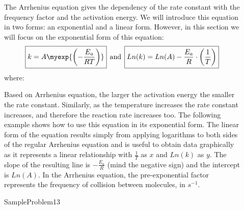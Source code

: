 \documentclass[main.tex]{subfiles}
\newcommand\chapterlabel{kinetics}
\begin{document}
\begin{description}
\item[] 
The Arrhenius equation gives the dependency of the rate constant with the frequency factor and the activation energy. We will introduce this equation in two forms: an exponential and a linear form. However, in this section we will focus on the exponential form of this equation:
\begin{equation}
\boxed{ k=A\myexp{\left(-\frac{E_a}{RT}\right)}} \>\>\text{and} \>\> \boxed{  Ln(k)=Ln(A)  -\frac{E_a}{R} \cdot \left(\frac{1}{T}\right) }
\label{\chapterlabel:equation4}
\end{equation}
where:
Based on Arrhenius equation, the larger the activation energy the smaller the rate constant. Similarly, as the temperature increases the rate constant increases, and therefore the reaction rate increases too. The following example shows how to use this equation in its exponential form.
The linear form of the equation results simply from applying logarithms to both sides of the regular Arrhenius equation and is useful to obtain data graphically as it represents a linear relationship with $\frac{1}{T}$ as $x$ and $Ln(k)$ as $y$. The slope of the resulting line is $-\frac{E_a}{R}$ (mind the negative sign) and the intercept is $Ln(A)$. In the Arrhenius equation, the pre-exponential factor represents the frequency of collision between molecules, in $s^{-1}$. 


  {SampleProblem13}



\end{description}
\end{document}
